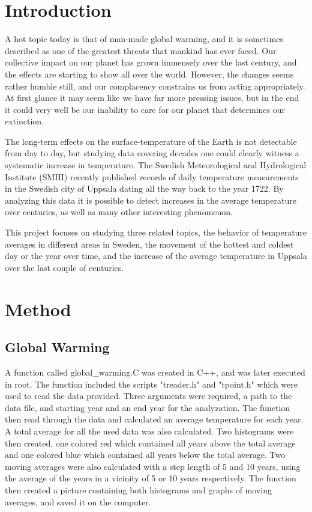 \section{Introduction}

A hot topic today is that of man-made global warming, and it is sometimes described as one of the greatest threats that mankind has ever faced. Our collective impact on our planet has grown immensely over the last century, and the effects are starting to show all over the world. However, the changes seems rather humble still, and our complacency constrains us from acting appropriately. At first glance it may seem like we have far more pressing issues, but in the end it could very well be our inability to care for our planet that determines our extinction.

The long-term effects on the surface-temperature of the Earth is not detectable from day to day, but studying data covering decades one could clearly witness a systematic increase in temperature. The Swedish Meteorological and Hydrological Institute (SMHI) recently published records of daily temperature measurements in the Swedish city of Uppsala dating all the way back to the year 1722. By analyzing this data it is possible to detect increases in the average temperature over centuries, as well as many other interesting phenomenon.

This project focuses on studying three related topics, the behavior of temperature averages in different areas in Sweden, the movement of the hottest and coldest day or the year over time, and the increase of the average temperature in Uppsala over the last couple of centuries.


\section{Method}

\subsection{Global Warming}

A function called global\_warming.C was created in C++, and was later executed in root. The function included the scripts "treader.h" and "tpoint.h" which were used to read the data provided. Three arguments were required, a path to the data file, and starting year and an end year for the analyzation. The function then read through the data and calculated an average temperature for each year. A total average for all the used data was also calculated. Two histograms were then created, one colored red which contained all years above the total average and one colored blue which contained all years below the total average. Two moving averages were also calculated with a step length of 5 and 10 years, using the average of the years in a vicinity of 5 or 10 years respectively. The function then created a picture containing both histograms and graphs of moving averages, and saved it on the computer.

